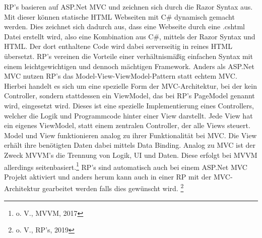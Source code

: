 \documentclass[a4paper,
12pt,
oneside]
{article}
\begin{document}
	RP's basieren auf ASP.Net MVC und zeichnen sich durch die Razor Syntax aus. Mit dieser können statische HTML Webseiten mit C\# dynamisch gemacht werden. Dies zeichnet sich dadurch aus, dass eine Webseite durch eine .cshtml Datei erstellt wird, also eine Kombination aus C\#, mittels der Razor Syntax und HTML. Der dort enthaltene Code wird dabei serverseitig in reines HTML übersetzt. RP's vereinen die Vorteile einer verhältnismäßig einfachen Syntax mit einem leichtgewichtigen und dennoch mächtigen Framework. Anders als ASP.Net MVC nutzen RP's das Model-View-ViewModel-Pattern statt echtem MVC. Hierbei handelt es sich um eine spezielle Form der MVC-Architektur, bei der kein Controller, sondern stattdessen ein ViewModel, das bei RP's PageModel genannt wird, eingesetzt wird. Dieses ist eine spezielle Implementierung eines Controllers, welcher die Logik und Programmcode hinter einer View darstellt. Jede View hat ein eigenes ViewModel, statt einem zentralen Controller, der alle Views steuert. Model und View funktionieren analog zu ihrer Funktionalität bei MVC. Die View erhält ihre benötigten Daten dabei mittels Data Binding. Analog zu MVC ist der Zweck MVVM's die Trennung von Logik, UI und Daten. Diese erfolgt bei MVVM allerdings seitenbasiert.\footnote{o. V., MVVM, 2017} RP's sind automatisch auch bei einem ASP.Net MVC Projekt aktiviert und anders herum kann auch in einer RP mit der MVC-Architektur gearbeitet werden falls dies gewünscht wird. \footnote{o. V., RP's, 2019}
	
\end{document}
